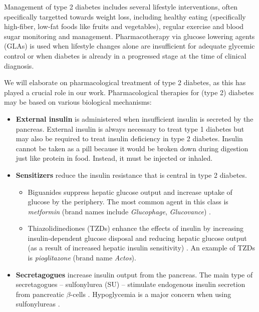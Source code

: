 Management of type 2 diabetes includes several lifestyle interventions, often specifically targetted towards weight loss, including healthy eating (specifically high-fiber, low-fat foods like fruits and vegetables), regular exercise and blood sugar monitoring and management. Pharmacotherapy via glucose lowering agents (GLAs) is used when lifestyle changes alone are insufficient for adequate glycemic control or when diabetes is already in a progressed stage at the time of clinical diagnosis. 

We will elaborate on pharmacological treatment of type 2 diabetes, as this has played a crucial role in our work. Pharmacological therapies for (type 2) diabetes may be based on various biological mechanisms:
\begin{itemize}
\item \textbf{External insulin} is administered when insufficient insulin is secreted by the pancreas. External insulin is always necessary to treat type 1 diabetes but may also be required to treat insulin deficiency in type 2 diabetes. Insulin cannot be taken as a pill because it would be broken down during digestion just like protein in food. Instead, it must be injected or inhaled. \\
\item \textbf{Sensitizers} reduce the insulin resistance that is central in type 2 diabetes.
\begin{itemize}
        \item Biguanides suppress hepatic glucose output and increase uptake of glucose by the periphery. The most common agent in this class is \emph{metformin} (brand names include \emph{Glucophage}, \emph{Glucovance}) \citep{kirpichnikov2002metformin}. \\ %
        \item Thiazolidinediones (TZDs) enhance the effects of insulin by increasing insulin-dependent glucose disposal and reducing hepatic glucose output (as a result of increased hepatic insulin sensitivity) \citep{saltiel1996thiazolidinediones, yki2004thiazolidinediones}. 
        An example of TZDs is \emph{pioglitazone} (brand name \emph{Actos}). \\
\end{itemize}
\item \textbf{Secretagogues} increase insulin output from the pancreas. The main type of secretagogues -- sulfonylurea (SU) -- stimulate endogenous insulin secretion from pancreatic $\beta$-cells \citep{proks2002sulfonylurea}. Hypoglycemia is a major concern when using sulfonylureas \citep{bodmer2008metformin}.

\end{itemize}
